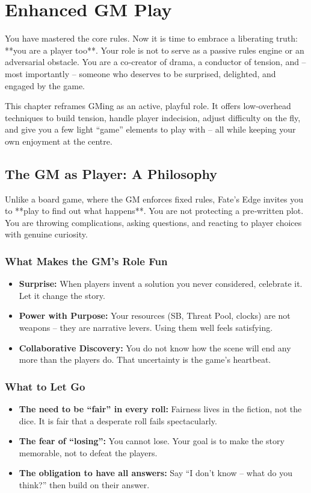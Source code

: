 \chapter{Enhanced GM Play}
\label{ch:enhanced-gm}

You have mastered the core rules. Now it is time to embrace a liberating truth: **you are a player too**. Your role is not to serve as a passive rules engine or an adversarial obstacle. You are a co‑creator of drama, a conductor of tension, and – most importantly – someone who deserves to be surprised, delighted, and engaged by the game.

This chapter reframes GMing as an active, playful role. It offers low‑overhead techniques to build tension, handle player indecision, adjust difficulty on the fly, and give you a few light “game” elements to play with – all while keeping your own enjoyment at the centre.

\section{The GM as Player: A Philosophy}

Unlike a board game, where the GM enforces fixed rules, Fate’s Edge invites you to **play to find out what happens**. You are not protecting a pre‑written plot. You are throwing complications, asking questions, and reacting to player choices with genuine curiosity.

\subsection*{What Makes the GM’s Role Fun}
\begin{itemize}
  \item \textbf{Surprise:} When players invent a solution you never considered, celebrate it. Let it change the story.
  \item \textbf{Power with Purpose:} Your resources (SB, Threat Pool, clocks) are not weapons – they are narrative levers. Using them well feels satisfying.
  \item \textbf{Collaborative Discovery:} You do not know how the scene will end any more than the players do. That uncertainty is the game’s heartbeat.
\end{itemize}

\subsection*{What to Let Go}
\begin{itemize}
  \item \textbf{The need to be “fair” in every roll:} Fairness lives in the fiction, not the dice. It is fair that a desperate roll fails spectacularly.
  \item \textbf{The fear of “losing”:} You cannot lose. Your goal is to make the story memorable, not to defeat the players.
  \item \textbf{The obligation to have all answers:} Say “I don’t know – what do you think?” then build on their answer.
\end{itemize}

